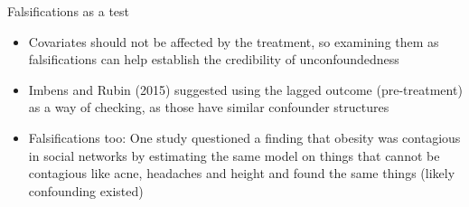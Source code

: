 \begin{frame}{Falsifications as a test}

\begin{itemize}
\item Covariates should not be affected by the treatment, so examining them as falsifications can help establish the credibility of unconfoundedness
\item Imbens and Rubin (2015) suggested using the lagged outcome (pre-treatment) as a way of checking, as those have similar confounder structures
\item Falsifications too: One study questioned a finding that obesity was contagious in social networks by estimating the same model on things that cannot be contagious like acne, headaches and height and found the same things (likely confounding existed)
\end{itemize}

\end{frame}




